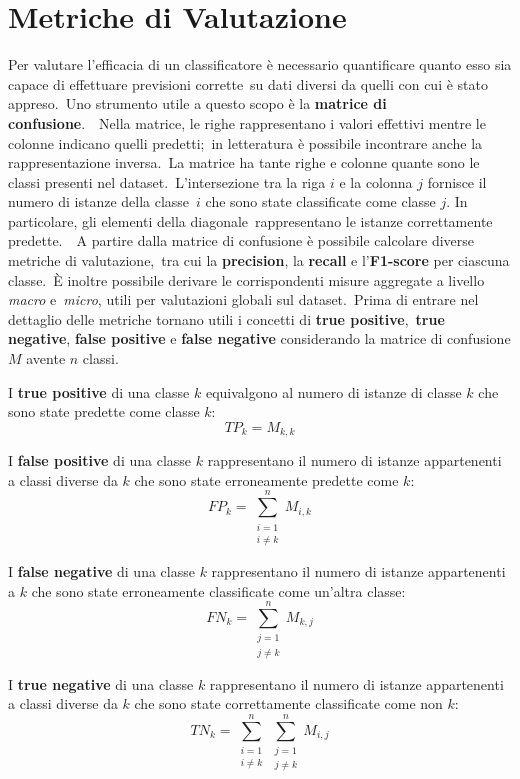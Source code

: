 \section{Metriche di Valutazione}

Per valutare l'efficacia di un classificatore è necessario quantificare quanto esso sia capace di effettuare previsioni corrette\
su dati diversi da quelli con cui è stato appreso.\
Uno strumento utile a questo scopo è la \textbf{matrice di confusione}.\
\
Nella matrice, le righe rappresentano i valori effettivi mentre le colonne indicano quelli predetti;\
in letteratura è possibile incontrare anche la rappresentazione inversa.\
La matrice ha tante righe e colonne quante sono le classi presenti nel dataset.\
L'intersezione tra la riga $i$ e la colonna $j$ fornisce il numero di istanze della classe\
$i$ che sono state classificate come classe $j$. In particolare, gli elementi della diagonale\
rappresentano le istanze correttamente predette.\
\
A partire dalla matrice di confusione è possibile calcolare diverse metriche di valutazione,\
tra cui la \textbf{precision}, la \textbf{recall} e l'\textbf{F1-score} per ciascuna classe.\
È inoltre possibile derivare le corrispondenti misure aggregate a livello \textit{macro} e\
\textit{micro}, utili per valutazioni globali sul dataset.\
Prima di entrare nel dettaglio delle metriche tornano utili i concetti di \textbf{true positive},\
\textbf{true negative}, \textbf{false positive} e \textbf{false negative} considerando la matrice di confusione $M$ avente $n$ classi.

I \textbf{true positive} di una classe $k$ equivalgono al numero di istanze di classe $k$ che
sono state predette come classe $k$:
\[
    TP_{k} = M_{k,k}
\]

I \textbf{false positive} di una classe $k$ rappresentano il numero di istanze appartenenti a
classi diverse da $k$ che sono state erroneamente predette come $k$:
\[
    FP_{k} = \sum_{\substack{i=1 \\ i \neq k}}^{n} M_{i,k}
\]

I \textbf{false negative} di una classe $k$ rappresentano il numero di istanze appartenenti a
$k$ che sono state erroneamente classificate come un'altra classe:
\[
    FN_{k} = \sum_{\substack{j=1 \\ j \neq k}}^{n} M_{k,j}
\]

I \textbf{true negative} di una classe $k$ rappresentano il numero di istanze appartenenti a
classi diverse da $k$ che sono state correttamente classificate come non $k$:
\[
    TN_{k} = \sum_{\substack{i=1 \\ i \neq k}}^{n}
    \sum_{\substack{j=1 \\ j \neq k}}^{n} M_{i,j}
\]

